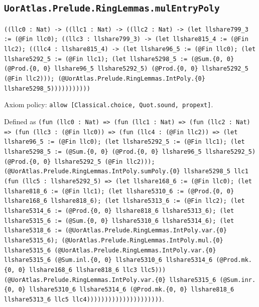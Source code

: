 \documentclass[11pt]{article}
\begin{document}
\subsection*{\texttt{UorAtlas.Prelude.RingLemmas.mulEntryPoly}}
\noindent\texttt{((llc0 : Nat) -> ((llc1 : Nat) -> ((llc2 : Nat) -> (let llshare799\_3 := (@Fin llc0); ((llc3 : llshare799\_3) -> (let llshare815\_4 := (@Fin llc2); ((llc4 : llshare815\_4) -> (let llshare96\_5 := (@Fin llc0); (let llshare5292\_5 := (@Fin llc1); (let llshare5298\_5 := (@Sum.\{0, 0\} (@Prod.\{0, 0\} llshare96\_5 llshare5292\_5) (@Prod.\{0, 0\} llshare5292\_5 (@Fin llc2))); (@UorAtlas.Prelude.RingLemmas.IntPoly.\{0\} llshare5298\_5)))))))))))}\par
\noindent Axiom policy: \texttt{allow [Classical.choice, Quot.sound, propext]}.\par
\noindent Defined as \texttt{(fun (llc0 : Nat) => (fun (llc1 : Nat) => (fun (llc2 : Nat) => (fun (llc3 : (@Fin llc0)) => (fun (llc4 : (@Fin llc2)) => (let llshare96\_5 := (@Fin llc0); (let llshare5292\_5 := (@Fin llc1); (let llshare5298\_5 := (@Sum.\{0, 0\} (@Prod.\{0, 0\} llshare96\_5 llshare5292\_5) (@Prod.\{0, 0\} llshare5292\_5 (@Fin llc2))); (@UorAtlas.Prelude.RingLemmas.IntPoly.sumPoly.\{0\} llshare5298\_5 llc1 (fun (llc5 : llshare5292\_5) => (let llshare168\_6 := (@Fin llc0); (let llshare818\_6 := (@Fin llc1); (let llshare5310\_6 := (@Prod.\{0, 0\} llshare168\_6 llshare818\_6); (let llshare5313\_6 := (@Fin llc2); (let llshare5314\_6 := (@Prod.\{0, 0\} llshare818\_6 llshare5313\_6); (let llshare5315\_6 := (@Sum.\{0, 0\} llshare5310\_6 llshare5314\_6); (let llshare5318\_6 := (@UorAtlas.Prelude.RingLemmas.IntPoly.var.\{0\} llshare5315\_6); (@UorAtlas.Prelude.RingLemmas.IntPoly.mul.\{0\} llshare5315\_6 (@UorAtlas.Prelude.RingLemmas.IntPoly.var.\{0\} llshare5315\_6 (@Sum.inl.\{0, 0\} llshare5310\_6 llshare5314\_6 (@Prod.mk.\{0, 0\} llshare168\_6 llshare818\_6 llc3 llc5))) (@UorAtlas.Prelude.RingLemmas.IntPoly.var.\{0\} llshare5315\_6 (@Sum.inr.\{0, 0\} llshare5310\_6 llshare5314\_6 (@Prod.mk.\{0, 0\} llshare818\_6 llshare5313\_6 llc5 llc4)))))))))))))))))))))}.\par
\end{document}
